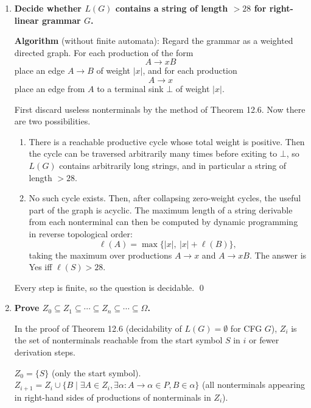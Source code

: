 \begin{enumerate}[{12.}1. ]
Then $R$ represents some string of length $>28$ iff $m(R)=29$. Since this
recursion follows the finite parse tree of $R$, it always halts. \qed

\item \textbf{Decide whether $L(G)$ contains a string of length $>28$ for right-linear grammar $G$.}

\textbf{Algorithm} (without finite automata): Regard the grammar as a weighted
directed graph. For each production of the form
\[
A\to xB
\]
place an edge $A\to B$ of weight $|x|$, and for each production
\[
A\to x
\]
place an edge from $A$ to a terminal sink $\bot$ of weight $|x|$.

First discard useless nonterminals by the method of Theorem 12.6. Now there are
two possibilities.

\begin{enumerate}
\item There is a reachable productive cycle whose total weight is positive.
Then the cycle can be traversed arbitrarily many times before exiting to
$\bot$, so $L(G)$ contains arbitrarily long strings, and in particular a string
of length $>28$.

\item No such cycle exists. Then, after collapsing zero-weight cycles, the
useful part of the graph is acyclic. The maximum length of a string derivable
from each nonterminal can then be computed by dynamic programming in reverse
topological order:
\[
\ell(A)=\max\{|x|,\ |x|+\ell(B)\},
\]
taking the maximum over productions $A\to x$ and $A\to xB$. The answer is Yes
iff $\ell(S)>28$.
\end{enumerate}

Every step is finite, so the question is decidable. \qed

\item \textbf{Prove $Z_0\subseteq Z_1\subseteq\cdots\subseteq Z_n\subseteq\cdots\subseteq\Omega$.}

In the proof of Theorem 12.6 (decidability of $L(G)=\emptyset$ for CFG $G$), $Z_i$ is the set of nonterminals reachable from the start symbol $S$ in $i$ or fewer derivation steps.

$Z_0 = \{S\}$ (only the start symbol).
$Z_{i+1} = Z_i \cup \{B \mid \exists A\in Z_i, \exists \alpha: A\to\alpha\in P, B\in\alpha\}$ (all nonterminals appearing in right-hand sides of productions of nonterminals in $Z_i$).


\end{enumerate}
